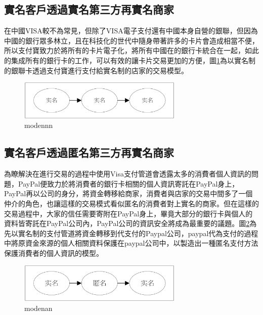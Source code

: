 

		\subsection{實名客戶透過實名第三方再實名商家}
		在中國VISA較不為常見，但除了VISA電子支付還有中國本身自營的銀聯，但因為中國的銀行眾多林立，且在科技化的世代中隨身帶著許多的卡片會造成相當不便，所以支付寶致力於將所有的卡片電子化，將所有中國在的銀行卡統合在一起，如此的集成所有的銀行卡的工作，可以有效的讓卡片交易更加的方便，圖\ref{modennn}為以實名制的銀聯卡透過支付寶進行支付給實名制的店家的交易模型。

		\begin{figure}[h]
			\centering
			\includegraphics[width = 0.7\textwidth]{modennn.png}
			\caption{modennn}\label{modennn}
		\end{figure}


		\subsection{實名客戶透過匿名第三方再實名商家}
		為瞭解決在進行交易的過程中使用Visa支付管道會透露太多的消費者個人資訊的問題，PayPal便致力於將消費者的銀行卡相關的個人資訊寄託在PayPal身上，PayPal再以公司的身分，將資金轉移給商家，消費者與店家的交易中間多了一個仲介的角色，也讓這樣的交易模式看似匿名的消費者對上實名的商家。但在這樣的交易過程中，大家的信任需要寄附在PayPal身上，畢竟大部分的銀行卡與個人的資料皆寄託在PayPal公司內，PayPal公司的資訊安全將成為最重要的議題。圖\ref{modenan}為先以實名制的支付管道將資金轉移到代支付的Paypal公司，paypal代為支付的過程中將原資金來源的個人相關資料保護在paypal公司中，以製造出一種匿名支付方法保護消費者的個人資訊的模型。

		\begin{figure}[h]
			\centering
			\includegraphics[width = 0.7\textwidth]{modenan.png}
			\caption{modenan}\label{modenan}
		\end{figure}



